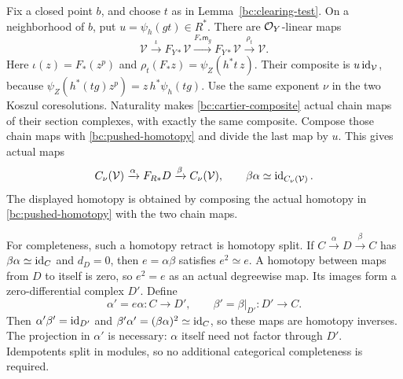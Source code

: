 Fix a closed point $b$, and choose $t$ as in
Lemma~\ref{bc:clearing-test}.  On a neighborhood of $b$, put
$u=\psi_h(gt)\in R^*$.  There are $\mathcal O_Y$-linear maps
\begin{equation}\label{bc:cartier-composite}
 \mathcal V\xrightarrow{\iota}F_{Y*}\mathcal V
 \xrightarrow{F_*\mathsf m_g}F_{Y*}\mathcal V
 \xrightarrow{\rho_t}\mathcal V.
\end{equation}
Here $\iota(z)=F_*(z^p)$ and
$\rho_t(F_*z)=\psi_Z(h^*t\,z)$.
Their composite is $u\operatorname{id}_{\mathcal V}$, because
$\psi_Z(h^*(tg)z^p)=z\,h^*\psi_h(tg)$.
Use the same exponent $\nu$ in the two Koszul coresolutions.  Naturality
makes \eqref{bc:cartier-composite} actual chain maps of their section
complexes, with exactly the same composite.  Compose those chain maps
with \eqref{bc:pushed-homotopy} and divide the last map by $u$.  This
gives actual maps
\[
 C_\nu(\mathcal V)\xrightarrow{\alpha}F_{R*}D
       \xrightarrow{\beta}C_\nu(\mathcal V),
 \qquad \beta\alpha\simeq\operatorname{id}_{C_\nu(\mathcal V)}.
\]
The displayed homotopy is obtained by composing the actual homotopy in
\eqref{bc:pushed-homotopy} with the two chain maps.

For completeness, such a homotopy retract is homotopy split.  If
$C\xrightarrow{\alpha}D\xrightarrow{\beta}C$ has
$\beta\alpha\simeq\operatorname{id}_C$ and $d_D=0$, then
$e=\alpha\beta$ satisfies $e^2\simeq e$.  A homotopy between maps
from $D$ to itself is zero, so $e^2=e$ as an actual degreewise map.
Its images form a zero-differential complex $D'$.  Define
\[
 \alpha'=e\alpha:C\longrightarrow D',\qquad
 \beta'=\beta|_{D'}:D'\longrightarrow C.
\]
Then $\alpha'\beta'=\operatorname{id}_{D'}$ and
$\beta'\alpha'=(\beta\alpha)^2\simeq\operatorname{id}_C$, so these maps are
homotopy inverses.  The projection in $\alpha'$ is necessary:
$\alpha$ itself need not factor through $D'$.  Idempotents split in
modules, so no additional categorical completeness is required.

